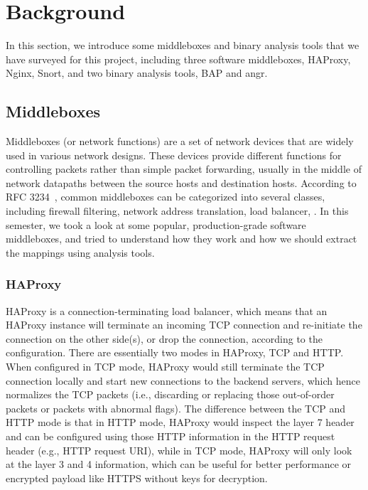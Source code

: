 \section{Background}

In this section, we introduce some middleboxes and binary analysis tools that
we have surveyed for this project, including three software middleboxes, \ca
HAProxy, \cb Nginx, \cc Snort, and two binary analysis tools, \ca BAP and \cb
angr.


\subsection{Middleboxes}

Middleboxes (or network functions) are a set of network devices that are widely
used in various network designs. These devices provide different functions for
controlling packets rather than simple packet forwarding, usually in the middle
of network datapaths between the source hosts and destination hosts. According
to RFC 3234~\cite{rfc3234}, common middleboxes can be categorized into several
classes, including firewall filtering, network address translation, load
balancer, \etc. In this semester, we took a look at some popular,
production-grade software middleboxes, and tried to understand how they work and
how we should extract the mappings using analysis tools.

\subsubsection{HAProxy}

HAProxy is a connection-terminating load balancer, which means that an HAProxy
instance will terminate an incoming TCP connection and re-initiate the
connection on the other side(s), or drop the connection, according to the
configuration. There are essentially two modes in HAProxy, TCP and HTTP. When
configured in TCP mode, HAProxy would still terminate the TCP connection locally
and start new connections to the backend servers, which hence normalizes the TCP
packets (i.e., discarding or replacing those out-of-order packets or packets
with abnormal flags). The difference between the TCP and HTTP mode is that in
HTTP mode, HAProxy would inspect the layer 7 header and can be configured using
those HTTP information in the HTTP request header (e.g., HTTP request URI),
while in TCP mode, HAProxy will only look at the layer 3 and 4 information,
which can be useful for better performance or encrypted payload like HTTPS
without keys for decryption.

